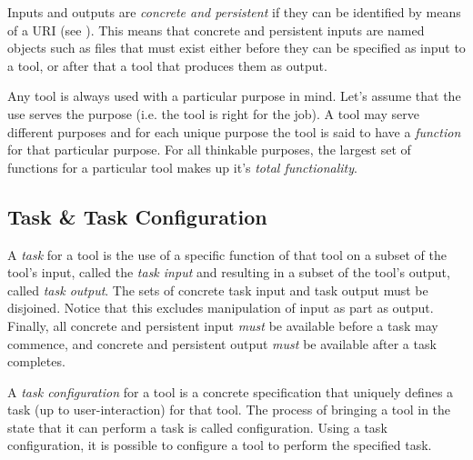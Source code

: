 \documentclass{article}
\begin{document}
   Inputs and outputs are \textit{concrete and persistent} if they can be
   identified by means of a URI (see \cite{rfc3305}). This means that concrete
   and persistent inputs are named objects such as files that must exist either
   before they can be specified as input to a tool, or after that a tool that
   produces them as output.
   
   Any tool is always used with a particular purpose in mind. Let's assume that
   the use serves the purpose (i.e. the tool is right for the job). A tool may
   serve different purposes and for each unique purpose the tool is said to
   have a \emph{function} for that particular purpose. For all thinkable
   purposes, the largest set of functions for a particular tool makes up it's
   \textit{total functionality}.


  \subsection{Task \& Task Configuration} \label{concepts::task_configuration}

   
   A \textit{task} for a tool is the use of a specific function of that tool on
   a subset of the tool's input, called the \textit{task input} and resulting
   in a subset of the tool's output, called \textit{task output}.  The sets of
   concrete task input and task output must be disjoined.  Notice that this
   excludes manipulation of input as part as output.  Finally, all concrete and
   persistent input \emph{must} be available before a task may commence, and
   concrete and persistent output \emph{must} be available after a task
   completes.

   A \textit{task configuration} for a tool is a concrete specification that
   uniquely defines a task (up to user-interaction) for that tool. The process
   of bringing a tool in the state that it can perform a task is called
   configuration. Using a task configuration, it is possible to configure a
   tool to perform the specified task.
\end{document}
